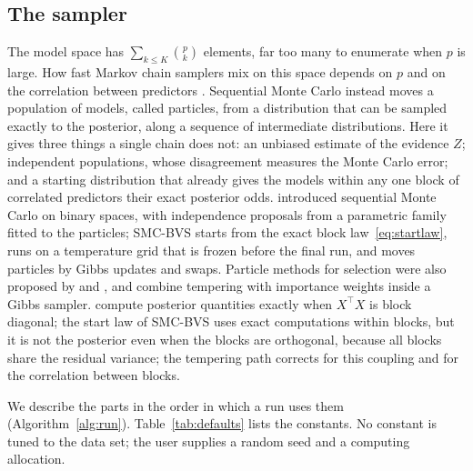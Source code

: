 \subsection{The sampler}\label{sec:model-sampler}

The model space has $\sum_{k\le K}\binom pk$ elements, far too many to enumerate when $p$ is large. How fast Markov
chain samplers mix on this space depends on $p$ and on the correlation between predictors
\citep{YangWainwrightJordan2016,GriffinLatuszynskiSteel2021,ZhouYangVatsRobertsRosenthal2022}. Sequential Monte Carlo
\citep{Chopin2002,DelMoralDoucetJasra2006} instead moves a population of models, called particles, from a
distribution that can be sampled exactly to the posterior, along a sequence of intermediate distributions. Here it
gives three things a single chain does not: an unbiased estimate of the evidence $Z$; independent populations, whose
disagreement measures the Monte Carlo error; and a starting distribution that already gives the models within any one
block of correlated predictors their exact posterior odds. \citet{SchaferChopin2013} introduced sequential Monte Carlo on binary
spaces, with independence proposals from a parametric family fitted to the particles; SMC-BVS starts from the exact
block law~\eqref{eq:startlaw}, runs on a temperature grid that is frozen before the final run, and moves particles by
Gibbs updates and swaps. Particle methods for selection were also proposed by \citet{ShiDunson2011} and
\citet{Duan2019}, and \citet{ZanellaRoberts2019} combine tempering with importance weights inside a Gibbs sampler.
\citet{PapaspiliopoulosRossell2017} compute posterior quantities exactly when $X^\top X$ is block diagonal; the start
law of SMC-BVS uses exact computations within blocks, but it is not the posterior even when the blocks are
orthogonal, because all blocks share the residual variance; the tempering path corrects for this coupling and for the
correlation between blocks.

We describe the parts in the order in which a run uses them (Algorithm~\ref{alg:run}). Table~\ref{tab:defaults}
lists the constants. No constant is tuned to the data set; the user supplies a random seed and a computing
allocation.

